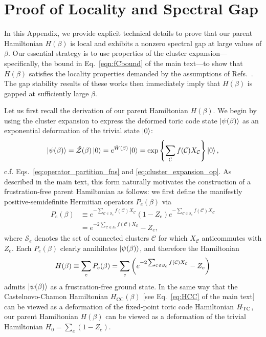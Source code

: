 \section{Proof of Locality and Spectral Gap}
\label{app:locality_proof}
In this Appendix, we provide explicit technical details to prove that our parent Hamiltonian $H(\beta)$ is local and exhibits a nonzero spectral gap at large values of $\beta$. Our essential strategy is to use properties of the cluster expansion---specifically, the bound in Eq.~\eqref{eqn:fCbound} of the main text---to show that $H(\beta)$ satisfies the locality properties demanded by the assumptions of Refs.~. The gap stability results of these works then immediately imply that $H(\beta)$ is gapped at sufficiently large $\beta$.

Let us first recall the derivation of our parent Hamiltonian $H(\beta)$. We begin by using the cluster expansion to express the deformed toric code state $\ket{\psi(\beta)}$ as an exponential deformation of the trivial state $\ket{0}$:
\begin{equation}
\label{eq:psi_deformed_app}
    \ket{\psi(\beta)} = \hat{\mathcal{Z}}(\beta) \ket{0} = e^{\hat{W}(\beta)} \ket{0} = \exp \qty{ \sum_{\mathcal{C}} f(\mathcal{C}) X_{\mathcal{C}} } \ket{0} ,
\end{equation}
c.f. Eqs.~\eqref{eq:operator_partition_fns} and \eqref{eq:cluster_expansion_op}. As described in the main text, this form naturally motivates the construction of a frustration-free parent Hamiltonian as follows: we first define the manifestly positive-semidefinite Hermitian operators $P_e(\beta)$ via
\begin{equation}
    \begin{split}
        P_e(\beta) &\equiv e^{- \sum_{\mathcal{C} \in \mathcal{S}_e} f(\mathcal{C}) X_{\mathcal{C}}} (1 - Z_e) e^{- \sum_{\mathcal{C} \in \mathcal{S}_e} f(\mathcal{C}) X_{\mathcal{C}}} \\
        &= e^{- 2\sum_{\mathcal{C} \in \mathcal{S}_e} f(\mathcal{C}) X_{\mathcal{C}}} - Z_e ,
    \end{split}
\end{equation}
where $\mathcal{S}_e$ denotes the set of connected clusters $\mathcal{C}$ for which $X_{\mathcal{C}}$ anticommutes with $Z_e$. Each $P_e(\beta)$ clearly annihilates $\ket{\psi(\beta)}$, and therefore the Hamiltonian
\begin{equation}
\label{eq:sm_parent_ham}
    H(\beta) \equiv \sum_e P_e(\beta) = \sum_e \qty( e^{- 2\sum_{\mathcal{C} \in \mathcal{S}_e} f(\mathcal{C}) X_{\mathcal{C}}} - Z_e )
\end{equation}
admits $\ket{\psi(\beta)}$ as a frustration-free ground state. In the same way that the Castelnovo-Chamon Hamiltonian $H_{\text{CC}}(\beta)$ [see Eq.~\eqref{eq:HCC} of the main text] can be viewed as a deformation of the fixed-point toric code Hamiltonian $H_{\text{TC}}$, our parent Hamiltonian $H(\beta)$ can be viewed as a deformation of the trivial Hamiltonian $H_0 = \sum_e (1 - Z_e)$.

